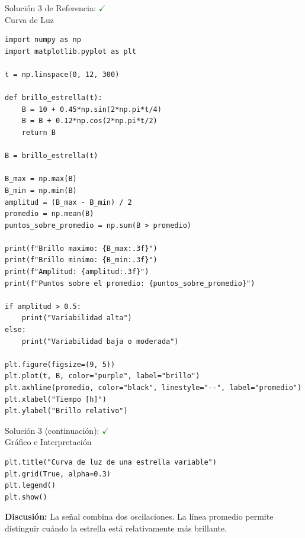 \documentclass[10pt]{beamer}
\begin{document}
\begin{solutionblock}
\begin{frame}[fragile]{Solución 3 de Referencia: \hfill \textcolor{green}{$\checkmark$} \\ Curva de Luz}
\begin{Verbatim}[fontsize=\tiny]
import numpy as np
import matplotlib.pyplot as plt

t = np.linspace(0, 12, 300)

def brillo_estrella(t):
    B = 10 + 0.45*np.sin(2*np.pi*t/4)
    B = B + 0.12*np.cos(2*np.pi*t/2)
    return B

B = brillo_estrella(t)

B_max = np.max(B)
B_min = np.min(B)
amplitud = (B_max - B_min) / 2
promedio = np.mean(B)
puntos_sobre_promedio = np.sum(B > promedio)

print(f"Brillo maximo: {B_max:.3f}")
print(f"Brillo minimo: {B_min:.3f}")
print(f"Amplitud: {amplitud:.3f}")
print(f"Puntos sobre el promedio: {puntos_sobre_promedio}")

if amplitud > 0.5:
    print("Variabilidad alta")
else:
    print("Variabilidad baja o moderada")

plt.figure(figsize=(9, 5))
plt.plot(t, B, color="purple", label="brillo")
plt.axhline(promedio, color="black", linestyle="--", label="promedio")
plt.xlabel("Tiempo [h]")
plt.ylabel("Brillo relativo")
\end{Verbatim}
\end{frame}
\end{solutionblock}

\begin{solutionblock}
\begin{frame}[fragile]{Solución 3 (continuación): \hfill \textcolor{green}{$\checkmark$} \\ Gráfico e Interpretación}
\begin{Verbatim}[fontsize=\tiny]
plt.title("Curva de luz de una estrella variable")
plt.grid(True, alpha=0.3)
plt.legend()
plt.show()
\end{Verbatim}
\textbf{Discusión:} La señal combina dos oscilaciones. La línea promedio permite distinguir cuándo la estrella está relativamente más brillante.
\end{frame}
\end{solutionblock}
\end{document}
